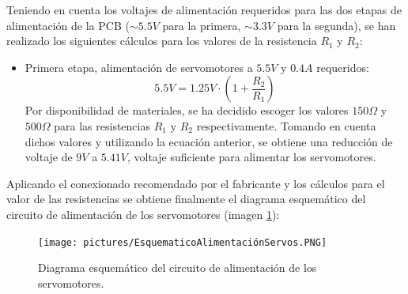Teniendo en cuenta los voltajes de alimentación requeridos para las dos etapas de alimentación de la \ac{PCB} ($\sim 5.5V$ para la primera, $\sim 3.3V$ para la segunda), se han realizado los siguientes cálculos para los valores de la resistencia $R_1$ y $R_2$:
\begin{itemize}
    \item Primera etapa, alimentación de servomotores a $5.5V$ y $0.4A$ requeridos:
    \begin{equation}
        5.5V = 1.25V \cdot \left( 1 + \frac{R_2}{R_1}\right) 
    \end{equation}
    Por disponibilidad de materiales, se ha decidido escoger los valores $150\Omega$ y $500\Omega$ para las resistencias $R_1$ y $R_2$ respectivamente. Tomando en cuenta dichos valores y utilizando la ecuación anterior, se obtiene una reducción de voltaje de $9V$ a $5.41V$, voltaje suficiente para alimentar los servomotores.
\end{itemize}

Aplicando el conexionado recomendado por el fabricante y los cálculos para el valor de las resistencias se obtiene finalmente el diagrama esquemático del circuito de alimentación de los servomotores (imagen \ref{fig:Esquematico_Alimentacion_Servos}):

\begin{figure}[H]
    \centering 
    \texttt{[image: pictures/EsquematicoAlimentaciónServos.PNG]}
    \caption{Diagrama esquemático del circuito de alimentación de los servomotores.}
    \label{fig:Esquematico_Alimentacion_Servos}
\end{figure}


